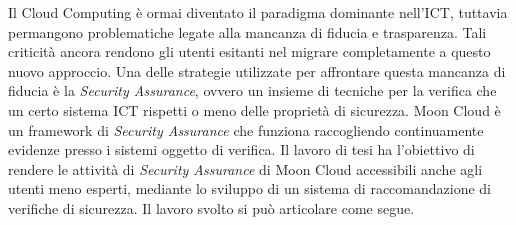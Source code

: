 \documentclass[10pt,a4paper]{article}
\begin{document}
\hfill\break
Il Cloud Computing è ormai diventato il paradigma dominante nell'ICT, tuttavia permangono problematiche legate alla mancanza di fiducia e trasparenza.
Tali criticità ancora rendono gli utenti esitanti nel migrare completamente a questo nuovo approccio.
Una delle strategie utilizzate per affrontare questa mancanza di fiducia è la \textit{Security Assurance}, ovvero un insieme di tecniche
per la verifica che un certo sistema ICT rispetti o meno delle proprietà di sicurezza. %
%
Moon Cloud è un framework di \textit{Security Assurance}%
che funziona raccogliendo continuamente evidenze presso i sistemi oggetto di verifica.
%
Il lavoro di tesi ha l'obiettivo di rendere le attività di \textit{Security Assurance} di Moon Cloud accessibili anche agli utenti meno esperti,
mediante lo sviluppo di un sistema di raccomandazione di verifiche di sicurezza. Il lavoro svolto si può articolare come segue.
\end{document}
